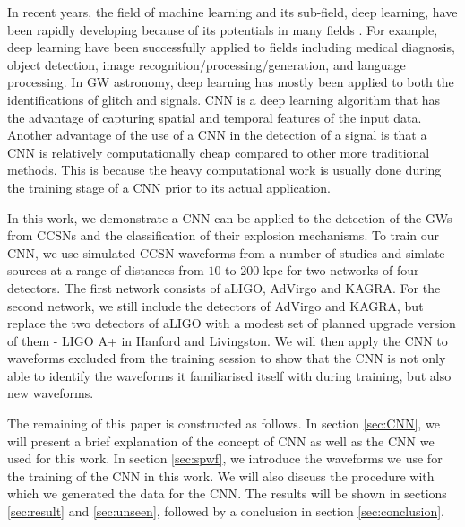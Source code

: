\documentclass[aps,twocolumn,showpacs,groupedaddress, nofootinbib]{revtex4}  %
\begin{document}
In recent years, the field of machine learning and its sub-field, deep learning, have been rapidly developing because of 
its potentials in many fields \cite{krizhevsky2012imagenet, NIPS2014_5423, simonyan2014very, chen2014semantic, zeiler2014visualizing, szegedy2015going}.
For example, deep learning have been successfully applied to fields including medical diagnosis\cite{kononenko2001machine}, object detection\cite{redmon2016you}, image recognition/processing/generation\cite{he2016deep, krizhevsky2012imagenet, zhang2016colorful, karpathy2015deep},    and  language processing\cite{lample2016neural}.
In \ac{GW} astronomy, deep learning has mostly been applied to both the identifications of glitch\cite{mukund2017transient, zevin2017gravity, george2017deep, gabbard2018matching} and signals\cite{george2018deep, astone2018new}. 
\ac{CNN} is a deep learning algorithm that has the advantage of capturing spatial and temporal features of the input data.
Another advantage of the use of a \ac{CNN} in the detection of a signal is that a \ac{CNN} is relatively computationally cheap compared to other more traditional methods.
This is because the heavy computational work is usually done during the training stage of a \ac{CNN} prior to its actual application\cite{goodfellow2016deep}.

In this work, we demonstrate a \ac{CNN} can be applied to the detection of the \acp{GW} from \acp{CCSN}
and the classification of their explosion mechanisms.
To train our \ac{CNN}, we use simulated \ac{CCSN} waveforms from a number of studies and simlate sources 
at a range of distances from $10$ to $200$ kpc for two networks of four detectors.
The first network consists of \ac{aLIGO}, \ac{AdVirgo} and KAGRA.
For the second network, we still include the detectors of \ac{AdVirgo} and KAGRA,  
but replace the two detectors of \ac{aLIGO} with 
a modest set of planned upgrade version of them - LIGO A+ in Hanford and Livingston\cite{miller2015prospects, LIGOW}.
We will then apply the \ac{CNN} to waveforms excluded from the training session to show that the \ac{CNN} 
is not only able to identify the waveforms it familiarised itself with during training, but also new waveforms.

The remaining of this paper is constructed as follows. 
In section \ref{sec:CNN}, we will present a brief explanation of the concept of \ac{CNN} as well as the \ac{CNN} we used for this work.
In section \ref{sec:spwf}, we introduce the waveforms we use for the training of the \ac{CNN} in this work. We will also discuss the procedure with which we generated the data for the \ac{CNN}.
The results will be shown in sections \ref{sec:result} and \ref{sec:unseen}, followed by a conclusion in section \ref{sec:conclusion}.
\end{document}
